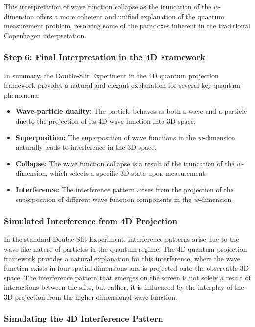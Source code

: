 \documentclass[12pt]{article}
\begin{document}
This interpretation of wave function collapse as the truncation of the \( w \)-dimension offers a more coherent and unified explanation of the quantum measurement problem, resolving some of the paradoxes inherent in the traditional Copenhagen interpretation.

\subsubsection*{Step 6: Final Interpretation in the 4D Framework}

In summary, the Double-Slit Experiment in the 4D quantum projection framework provides a natural and elegant explanation for several key quantum phenomena:

\begin{itemize}
    \item \textbf{Wave-particle duality:} The particle behaves as both a wave and a particle due to the projection of its 4D wave function into 3D space.
    \item \textbf{Superposition:} The superposition of wave functions in the \( w \)-dimension naturally leads to interference in the 3D space.
    \item \textbf{Collapse:} The wave function collapse is a result of the truncation of the \( w \)-dimension, which selects a specific 3D state upon measurement.
    \item \textbf{Interference:} The interference pattern arises from the projection of the superposition of different wave function components in the \( w \)-dimension.
\end{itemize}

\subsubsection{Simulated Interference from 4D Projection}

In the standard Double-Slit Experiment, interference patterns arise due to the wave-like nature of particles in the quantum regime. The 4D quantum projection framework provides a natural explanation for this interference, where the wave function exists in four spatial dimensions and is projected onto the observable 3D space. The interference pattern that emerges on the screen is not solely a result of interactions between the slits, but rather, it is influenced by the interplay of the 3D projection from the higher-dimensional wave function.

\subsubsection*{Simulating the 4D Interference Pattern}
\end{document}
